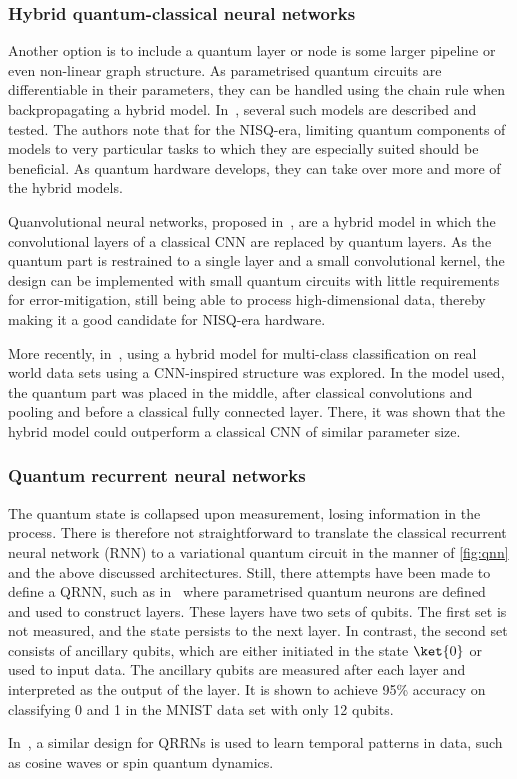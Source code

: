 \subsubsection{Hybrid quantum-classical neural networks}
Another option is to include a quantum layer or node is some larger pipeline or even non-linear graph structure.
As parametrised quantum circuits are differentiable in their parameters, they can be handled using the chain rule when backpropagating a hybrid model.
In~\autocite{killoran2019}, several such models are described and tested.
The authors note that for the NISQ-era, limiting quantum components of models to very particular tasks to which they are especially suited should be beneficial.
As quantum hardware develops, they can take over more and more of the hybrid models.

Quanvolutional neural networks, proposed in~\autocite{henderson2020}, are a hybrid model in which the convolutional layers of a classical CNN are replaced by quantum layers.
As the quantum part is restrained to a single layer and a small convolutional kernel, the design can be implemented with small quantum circuits with little requirements for error-mitigation, still being able to process high-dimensional data, thereby making it a good candidate for NISQ-era hardware.

More recently, in~\autocite{zeng2022}, using a hybrid model for multi-class classification on real world data sets using a CNN-inspired structure was explored.
In the model used, the quantum part was placed in the middle, after classical convolutions and pooling and before a classical fully connected layer.
There, it was shown that the hybrid model could outperform a classical CNN of similar parameter size.

\subsubsection{Quantum recurrent neural networks}
The quantum state is collapsed upon measurement, losing information in the process.
There is therefore not straightforward to translate the classical recurrent neural network (RNN) to a variational quantum circuit in the manner of \cref{fig:qnn} and the above discussed architectures.
Still, there attempts have been made to define a QRNN, such as in~\autocite{bausch2020} where parametrised quantum neurons are defined and used to construct layers.
These layers have two sets of qubits.
The first set is not measured, and the state persists to the next layer.
In contrast, the second set consists of ancillary qubits, which are either initiated in the state $\ket{0}$ or used to input data.
The ancillary qubits are measured after each layer and interpreted as the output of the layer.
It is shown to achieve 95\% accuracy on classifying 0 and 1 in the MNIST data set with only 12 qubits.

In~\autocite{takaki2021}, a similar design for QRRNs is used to learn temporal patterns in data, such as cosine waves or spin quantum dynamics.
